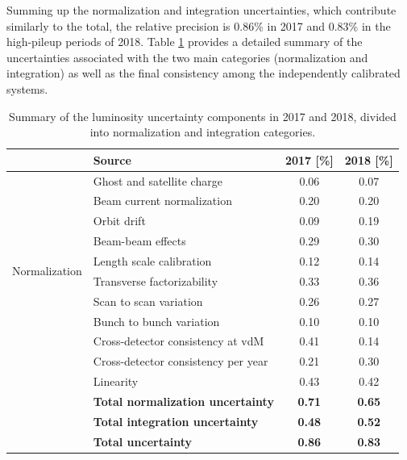 Summing up the normalization and integration uncertainties, which contribute similarly to the total, the relative precision is 0.86\% in 2017 and 0.83\% in the high-pileup periods of 2018. Table \ref{TAB:SystematicError} provides a detailed summary of the uncertainties associated with the two main categories (normalization and integration) as well as the final consistency among the independently calibrated systems.

 

\begin{table}[H]
    \caption[Summary of the luminosity uncertainty components in 2017 and 2018]{Summary of the luminosity uncertainty components in 2017 and 2018, divided into normalization and integration categories.}
    \label{TAB:SystematicError}
    \begin{tabular}{|l|l|c|c|}
      \hline
      & Source                                        & 2017 [\%] & 2018 [\%] \\
      \hline\hline
      \multirow{10}{*}{Normalization} 
      & \hspace{+2mm} Ghost and satellite charge      & 0.06 & 0.07 \\
      & \hspace{+2mm} Beam current normalization      & 0.20 & 0.20 \\
      & \hspace{+2mm} Orbit drift                     & 0.09 & 0.19 \\
      & \hspace{+2mm} Beam-beam effects               & 0.29 & 0.30 \\
      & \hspace{+2mm} Length scale calibration        & 0.12 & 0.14 \\
      & \hspace{+2mm} Transverse factorizability      & 0.33 & 0.36 \\
      & \hspace{+2mm} Scan to scan variation          & 0.26 & 0.27 \\
      & \hspace{+2mm} Bunch to bunch variation        & 0.10 & 0.10 \\
      & \hspace{+2mm} Cross-detector consistency at vdM  & 0.41 & 0.14 \\
      \hline\hline
      \multirow{2}{*}{Integration} 
      & \hspace{+2mm} Cross-detector consistency per year & 0.21 & 0.30 \\
      & \hspace{+2mm} Linearity                       & 0.43 & 0.42 \\
      \hline\hline
      & \textbf{Total normalization uncertainty}      & \textbf{0.71} & \textbf{0.65} \\
      & \textbf{Total integration uncertainty}        & \textbf{0.48} & \textbf{0.52} \\
      & \textbf{Total uncertainty}                    & \textbf{0.86} & \textbf{0.83} \\
      \hline
    \end{tabular}
\end{table}
